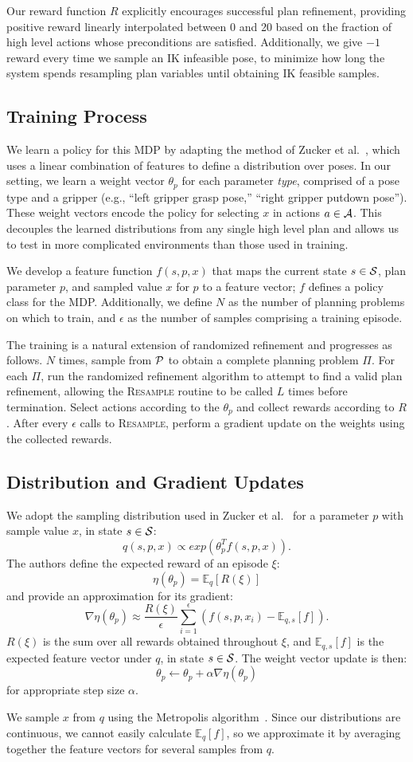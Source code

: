 Our reward function $R$ explicitly encourages successful plan refinement, providing positive reward linearly
interpolated between 0 and 20 based on the fraction of high level actions whose preconditions are
satisfied. Additionally, we give $-1$ reward every time we sample an IK infeasible pose,
to minimize how long the system spends resampling plan variables until obtaining IK feasible samples.

\subsection{Training Process}
We learn a policy for this MDP by adapting the method of Zucker et al.~\cite{workspacebias}, which
uses a linear combination of features to define a distribution over poses. In our setting, we learn a weight
vector $\theta_{p}$ for each parameter \emph{type}, comprised of a pose type and a gripper
(e.g., ``left gripper grasp pose,'' ``right gripper putdown pose'').
These weight vectors encode the policy for selecting $x$ in actions $a \in \mathcal{A}$.
This decouples the learned distributions from any single high level plan and allows us to
test in more complicated environments than those used in training.

We develop a feature function $f(s, p, x)$ that maps the current
state $s \in \mathcal{S}$, plan parameter $p$, and sampled value $x$ for $p$ to a
feature vector; $f$ defines a policy class for the MDP. Additionally, we define
$N$ as the number of planning problems on which to train, and
$\epsilon$ as the number of samples comprising a training episode.

The training is a natural extension of randomized
refinement and progresses as follows. $N$ times, sample from $\mathcal{P}$ to obtain
a complete planning problem $\Pi$. For each $\Pi$, run the randomized refinement
algorithm to attempt to find a valid plan refinement, allowing the \textsc{Resample}
routine to be called $L$ times before termination. Select actions according to the $\theta_{p}$
and collect rewards according to $R$. After every $\epsilon$ calls to
\textsc{Resample}, perform a gradient update on the weights using the
collected rewards.

\subsection{Distribution and Gradient Updates}
We adopt the sampling distribution used in Zucker et al.~\cite{workspacebias}
for a parameter $p$ with sample value $x$, in state $s \in \mathcal{S}$:
$$q(s, p, x) \propto exp(\theta_{p}^{T} f(s, p, x)).$$
The authors define the expected reward of an episode $\xi$:
$$\eta(\theta_{p}) = \mathbb{E}_{q}[R(\xi)]$$ and provide an approximation for its gradient:
$$\nabla \eta(\theta_{p}) \approx \frac{R(\xi)}{\epsilon} \sum_{i=1}^{\epsilon}(f(s, p, x_{i}) - \mathbb{E}_{q,s}[f]).$$
$R(\xi)$ is the sum over all rewards obtained throughout $\xi$, and
$\mathbb{E}_{q,s}[f]$ is the expected feature vector under $q$, in state $s \in \mathcal{S}$. The weight vector update is then:
$$\theta_{p} \leftarrow \theta_{p} + \alpha \nabla \eta(\theta_{p})$$
for appropriate step size $\alpha$.

We sample $x$ from $q$ using the Metropolis algorithm~\cite{chib1995understanding}.
Since our distributions are continuous, we cannot easily calculate $\mathbb{E}_{q}[f]$,
so we approximate it by averaging together the feature vectors for several samples from $q$.
